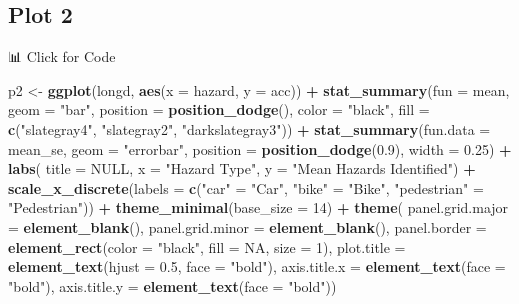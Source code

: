 \documentclass[
]{book}
\newenvironment{Shaded}{\begin{snugshade}}{\end{snugshade}}
\newcommand{\AttributeTok}[1]{\textcolor[rgb]{0.13,0.29,0.53}{#1}}
\newcommand{\ConstantTok}[1]{\textcolor[rgb]{0.56,0.35,0.01}{#1}}
\newcommand{\DecValTok}[1]{\textcolor[rgb]{0.00,0.00,0.81}{#1}}
\newcommand{\FloatTok}[1]{\textcolor[rgb]{0.00,0.00,0.81}{#1}}
\newcommand{\FunctionTok}[1]{\textcolor[rgb]{0.13,0.29,0.53}{\textbf{#1}}}
\newcommand{\NormalTok}[1]{#1}
\newcommand{\OtherTok}[1]{\textcolor[rgb]{0.56,0.35,0.01}{#1}}
\newcommand{\SpecialCharTok}[1]{\textcolor[rgb]{0.81,0.36,0.00}{\textbf{#1}}}
\newcommand{\StringTok}[1]{\textcolor[rgb]{0.31,0.60,0.02}{#1}}
\let\oldsubsection\subsection
\renewcommand{\subsection}{\needspace{3\baselineskip}\oldsubsection}  %
\begin{document}
\subsection{Plot 2}\label{plot-2}

📊 Click for Code

\begin{Shaded}
\begin{Highlighting}[]
\NormalTok{p2 }\OtherTok{\textless{}{-}} \FunctionTok{ggplot}\NormalTok{(longd, }\FunctionTok{aes}\NormalTok{(}\AttributeTok{x =}\NormalTok{ hazard, }\AttributeTok{y =}\NormalTok{ acc)) }\SpecialCharTok{+}
  \FunctionTok{stat\_summary}\NormalTok{(}\AttributeTok{fun =}\NormalTok{ mean, }\AttributeTok{geom =} \StringTok{"bar"}\NormalTok{, }
               \AttributeTok{position =} \FunctionTok{position\_dodge}\NormalTok{(), }
               \AttributeTok{color =} \StringTok{"black"}\NormalTok{,}
               \AttributeTok{fill =} \FunctionTok{c}\NormalTok{(}\StringTok{"slategray4"}\NormalTok{, }\StringTok{"slategray2"}\NormalTok{, }\StringTok{"darkslategray3"}\NormalTok{)) }\SpecialCharTok{+}
  \FunctionTok{stat\_summary}\NormalTok{(}\AttributeTok{fun.data =}\NormalTok{ mean\_se, }\AttributeTok{geom =} \StringTok{"errorbar"}\NormalTok{, }
               \AttributeTok{position =} \FunctionTok{position\_dodge}\NormalTok{(}\FloatTok{0.9}\NormalTok{), }\AttributeTok{width =} \FloatTok{0.25}\NormalTok{) }\SpecialCharTok{+}
  \FunctionTok{labs}\NormalTok{(}
    \AttributeTok{title =} \ConstantTok{NULL}\NormalTok{,}
    \AttributeTok{x =} \StringTok{"Hazard Type"}\NormalTok{,}
    \AttributeTok{y =} \StringTok{"Mean Hazards Identified"}\NormalTok{) }\SpecialCharTok{+}
  \FunctionTok{scale\_x\_discrete}\NormalTok{(}\AttributeTok{labels =} \FunctionTok{c}\NormalTok{(}\StringTok{"car"} \OtherTok{=} \StringTok{"Car"}\NormalTok{, }\StringTok{"bike"} \OtherTok{=} \StringTok{"Bike"}\NormalTok{, }\StringTok{"pedestrian"} \OtherTok{=} \StringTok{"Pedestrian"}\NormalTok{)) }\SpecialCharTok{+}
  \FunctionTok{theme\_minimal}\NormalTok{(}\AttributeTok{base\_size =} \DecValTok{14}\NormalTok{) }\SpecialCharTok{+}
  \FunctionTok{theme}\NormalTok{(}
    \AttributeTok{panel.grid.major =} \FunctionTok{element\_blank}\NormalTok{(),}
    \AttributeTok{panel.grid.minor =} \FunctionTok{element\_blank}\NormalTok{(),}
    \AttributeTok{panel.border =} \FunctionTok{element\_rect}\NormalTok{(}\AttributeTok{color =} \StringTok{"black"}\NormalTok{, }\AttributeTok{fill =} \ConstantTok{NA}\NormalTok{, }\AttributeTok{size =} \DecValTok{1}\NormalTok{),}
    \AttributeTok{plot.title =} \FunctionTok{element\_text}\NormalTok{(}\AttributeTok{hjust =} \FloatTok{0.5}\NormalTok{, }\AttributeTok{face =} \StringTok{"bold"}\NormalTok{),}
    \AttributeTok{axis.title.x =} \FunctionTok{element\_text}\NormalTok{(}\AttributeTok{face =} \StringTok{"bold"}\NormalTok{),}
    \AttributeTok{axis.title.y =} \FunctionTok{element\_text}\NormalTok{(}\AttributeTok{face =} \StringTok{"bold"}\NormalTok{))}
\end{Highlighting}
\end{Shaded}
\end{document}
